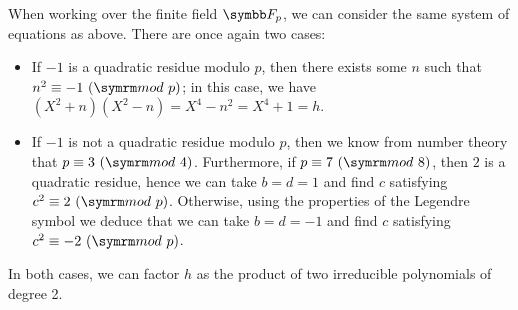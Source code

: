 \begin{solution}
When working over the finite field \(\finitefield{p}\), we can consider the same system of equations as above. There are once again two cases:
\begin{itemize}
    \item If \(-1\) is a quadratic residue modulo \(p\), then there exists some \(n\) such that \(n^2 \equiv -1 \Mod{p}\); in this case, we have \((X^2 + n) (X^2 - n) = X^4 - n^2 = X^4 + 1 = h\).

    \item If \(-1\) is not a quadratic residue modulo \(p\), then we know from number theory that \(p \equiv 3 \Mod{4}\). Furthermore, if \(p \equiv 7 \Mod{8}\), then \(2\) is a quadratic residue, hence we can take \(b = d = 1\) and find \(c\) satisfying \(c^2 \equiv 2 \Mod{p}\). Otherwise, using the properties of the Legendre symbol we deduce that we can take \(b = d = -1\) and find \(c\) satisfying \(c^2 \equiv -2 \Mod{p}\).
\end{itemize}
In both cases, we can factor \(h\) as the product of two irreducible polynomials of degree 2.
\end{solution}